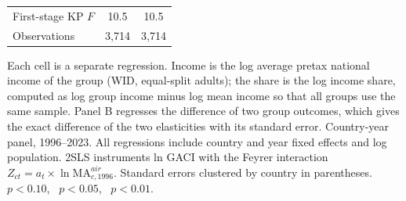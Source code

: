 \begin{table}[H]
\begin{threeparttable}
\begin{tabular}{lcccc}
\midrule
First-stage KP $F$ & \multicolumn{2}{c}{10.5} & \multicolumn{2}{c}{10.5} \\
Observations & \multicolumn{2}{c}{3{,}714} & \multicolumn{2}{c}{3{,}714} \\
\bottomrule
\end{tabular}
\begin{tablenotes}\small
\item Each cell is a separate regression. Income is the log average pretax national income of the group (WID, equal-split adults); the share is the log income share, computed as log group income minus log mean income so that all groups use the same sample. Panel B regresses the difference of two group outcomes, which gives the exact difference of the two elasticities with its standard error. Country-year panel, 1996--2023. All regressions include country and year fixed effects and log population. 2SLS instruments ln GACI with the Feyrer interaction $Z_{ct}=a_t\times\ln \mathrm{MA}^{air}_{c,1996}$. Standard errors clustered by country in parentheses. \sym{*}~$p<0.10$, \sym{**}~$p<0.05$, \sym{***}~$p<0.01$.
\end{tablenotes}
\end{threeparttable}
\end{table}
